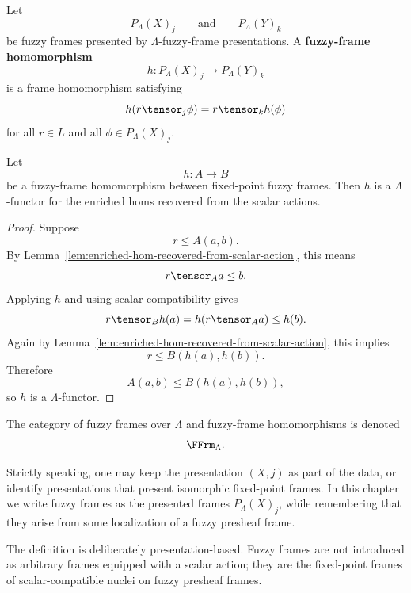 \begin{definition}
\label{def:fuzzy-frame-homomorphism}
Let
\[
    P_\Lambda(X)_j
    \qquad\text{and}\qquad
    P_\Lambda(Y)_k
\]
be fuzzy frames presented by \(\Lambda\)-fuzzy-frame presentations. A
\textbf{fuzzy-frame homomorphism}
\[
    h:P_\Lambda(X)_j\to P_\Lambda(Y)_k
\]
is a frame homomorphism satisfying
\[
    h(r\tensor_j\phi)=r\tensor_k h(\phi)
\]
for all \(r\in L\) and all \(\phi\in P_\Lambda(X)_j\).
\end{definition}

\begin{corollary}
\label{cor:fuzzy-frame-homomorphisms-are-enriched}
Let
\[
    h:A\to B
\]
be a fuzzy-frame homomorphism between fixed-point fuzzy frames. Then \(h\) is a
\(\Lambda\)-functor for the enriched homs recovered from the scalar actions.
\end{corollary}

\begin{proof}
Suppose
\[
    r\leq A(a,b).
\]
By Lemma~\ref{lem:enriched-hom-recovered-from-scalar-action}, this means
\[
    r\tensor_A a\leq b.
\]
Applying \(h\) and using scalar compatibility gives
\[
    r\tensor_B h(a)
    =
    h(r\tensor_A a)
    \leq
    h(b).
\]
Again by Lemma~\ref{lem:enriched-hom-recovered-from-scalar-action}, this implies
\[
    r\leq B(h(a),h(b)).
\]
Therefore
\[
    A(a,b)\leq B(h(a),h(b)),
\]
so \(h\) is a \(\Lambda\)-functor.
\end{proof}

\begin{definition}
\label{def:category-fuzzy-frames}
The category of fuzzy frames over \(\Lambda\) and fuzzy-frame homomorphisms is denoted
\[
    \FFrm_\Lambda.
\]
\end{definition}

\begin{remark}[Presentations]
\label{rem:fuzzy-frames-presentation-based}
Strictly speaking, one may keep the presentation \((X,j)\) as part of the data, or
identify presentations that present isomorphic fixed-point frames. In this chapter we
write fuzzy frames as the presented frames \(P_\Lambda(X)_j\), while remembering that
they arise from some localization of a fuzzy presheaf frame.

The definition is deliberately presentation-based. Fuzzy frames are not introduced as
arbitrary frames equipped with a scalar action; they are the fixed-point frames of
scalar-compatible nuclei on fuzzy presheaf frames.
\end{remark}

